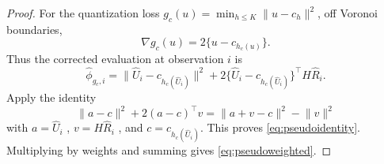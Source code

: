 \documentclass[10pt,a4paper]{amsart}
\newcommand{\hR}{\widehat R}
\newcommand{\hU}{\widehat U}
\newcommand{\hphi}{\widehat\phi}
\newcommand{\norm}[1]{\lVert #1\rVert}
\begin{document}
\begin{proof}
For the quantization loss $g_c(u)=\min_{h\le K}\norm{u-c_h}^2$, off Voronoi boundaries,
\[
\nabla g_c(u)=2\{u-c_{h_c(u)}\}.
\]
Thus the corrected evaluation at observation $i$ is
\[
\hphi_{g_c,i}
=
\norm{\hU_i-c_{h_c(\hU_i)}}^2
+
2\{\hU_i-c_{h_c(\hU_i)}\}^\top H\hR_i .
\]
Apply the identity
\[
\norm{a-c}^2+2(a-c)^\top v
=
\norm{a+v-c}^2-\norm{v}^2
\]
with $a=\hU_i$
, $v=H\hR_i$
, and $c=c_{h_c (\hU_i)}$.
This proves \eqref{eq:pseudoidentity}. Multiplying by weights and summing gives \eqref{eq:pseudoweighted}.
\end{proof}
\end{document}
